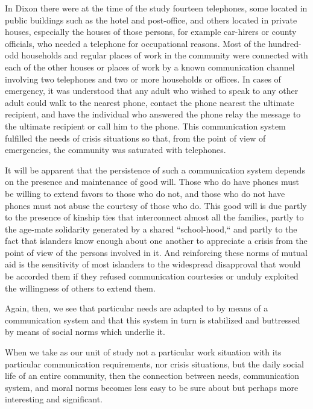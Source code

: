 \documentclass[twoside,symmetric,nobib,justified]{tufte-book}
\begin{document}
In Dixon there were at the time of the study fourteen telephones, some
located in public buildings such as the hotel and post-office, and
others located in private houses, especially the houses of those
persons, for example car-hirers or county officials, who needed a
telephone for occupational reasons. Most of the hundred-odd households
and regular places of work in the community were connected with each of
the other houses or places of work by a known communication channel
involving two telephones and two or more households or offices. In cases
of emergency, it was understood that any adult who wished to speak to
any other adult could walk to the nearest phone, contact the phone
nearest the ultimate recipient, and have the individual who answered the
phone relay the message to the ultimate recipient or call him to the
phone. This communication system fulfilled the needs of crisis
situations so that, from the point of view of emergencies, the community
was saturated with telephones.

It will be apparent that the persistence of such a communication system
depends on the presence and maintenance of good will. Those who do have
phones must be willing to extend favors to those who do not, and those
who do not have phones must not abuse the courtesy of those who do. This
good will is due partly to the presence of kinship ties that
interconnect almost all the families, partly to the age-mate solidarity
generated by a shared ``school-hood,`` and partly to the fact that
islanders know enough about one another to appreciate a crisis from the
point of view of the persons involved in it. And reinforcing these norms
of mutual aid is the sensitivity of most islanders to the widespread
disapproval that would be accorded them if they refused communication
courtesies or unduly exploited the willingness of others to extend them.

Again, then, we see that particular needs are adapted to by means of a
communication system and that this system in turn is stabilized and
buttressed by means of social norms which underlie it.

When we take as our unit of study not a particular work situation with
its particular communication requirements, nor crisis situations, but
the daily social life of an entire community, then the connection
between needs, communication system, and moral norms becomes less easy
to be sure about but perhaps more interesting and significant.
\end{document}
